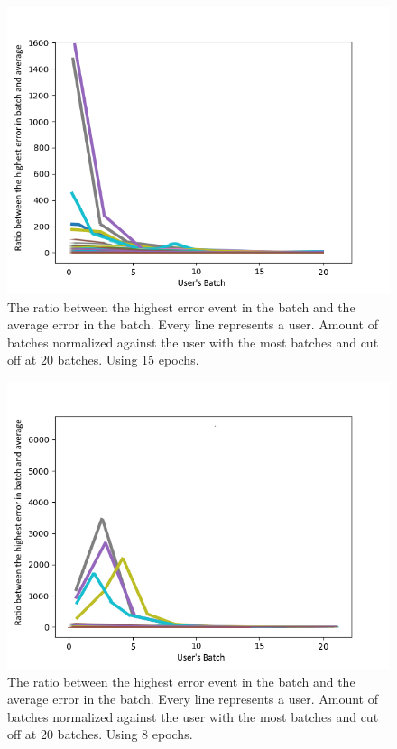 \begin{figure}
	\begin{center}
		\includegraphics[scale=0.7]{experiments/epochs/15-epochs}
	\end{center}
	\caption{The ratio between the highest error event in the batch and the average error in the batch. Every line represents a user. Amount of batches normalized against the user with the most batches and cut off at 20 batches. Using 15 epochs.~\label{fig:15-epochs}}
\end{figure}


\begin{figure}
	\begin{center}
		\includegraphics[scale=0.7]{experiments/epochs/8-epochs}
	\end{center}
	\caption{The ratio between the highest error event in the batch and the average error in the batch. Every line represents a user. Amount of batches normalized against the user with the most batches and cut off at 20 batches. Using 8 epochs.~\label{fig:8-epochs}}
\end{figure}

